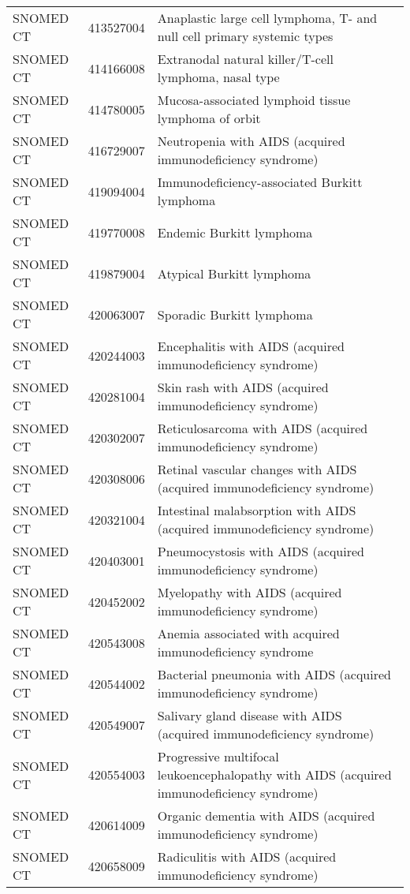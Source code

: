 \begin{table}[ht]
\begin{tabular}{lll}
  SNOMED CT & 413527004 & Anaplastic large cell lymphoma, T- and null cell primary systemic types \\ 
  SNOMED CT & 414166008 & Extranodal natural killer/T-cell lymphoma, nasal type \\ 
  SNOMED CT & 414780005 & Mucosa-associated lymphoid tissue lymphoma of orbit \\ 
  SNOMED CT & 416729007 & Neutropenia with AIDS (acquired immunodeficiency syndrome) \\ 
  SNOMED CT & 419094004 & Immunodeficiency-associated Burkitt lymphoma \\ 
  SNOMED CT & 419770008 & Endemic Burkitt lymphoma \\ 
  SNOMED CT & 419879004 & Atypical Burkitt lymphoma \\ 
  SNOMED CT & 420063007 & Sporadic Burkitt lymphoma \\ 
  SNOMED CT & 420244003 & Encephalitis with AIDS (acquired immunodeficiency syndrome) \\ 
  SNOMED CT & 420281004 & Skin rash with AIDS (acquired immunodeficiency syndrome) \\ 
  SNOMED CT & 420302007 & Reticulosarcoma with AIDS (acquired immunodeficiency syndrome) \\ 
  SNOMED CT & 420308006 & Retinal vascular changes with AIDS (acquired immunodeficiency syndrome) \\ 
  SNOMED CT & 420321004 & Intestinal malabsorption with AIDS (acquired immunodeficiency syndrome) \\ 
  SNOMED CT & 420403001 & Pneumocystosis with AIDS (acquired immunodeficiency syndrome) \\ 
  SNOMED CT & 420452002 & Myelopathy with AIDS (acquired immunodeficiency syndrome) \\ 
  SNOMED CT & 420543008 & Anemia associated with acquired immunodeficiency syndrome \\ 
  SNOMED CT & 420544002 & Bacterial pneumonia with AIDS (acquired immunodeficiency syndrome) \\ 
  SNOMED CT & 420549007 & Salivary gland disease with AIDS (acquired immunodeficiency syndrome) \\ 
  SNOMED CT & 420554003 & Progressive multifocal leukoencephalopathy with AIDS (acquired immunodeficiency syndrome) \\ 
  SNOMED CT & 420614009 & Organic dementia with AIDS (acquired immunodeficiency syndrome) \\ 
  SNOMED CT & 420658009 & Radiculitis with AIDS (acquired immunodeficiency syndrome) \\ 

\end{tabular}
\end{table}
